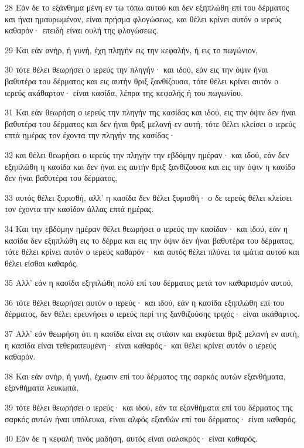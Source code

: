 \par 28 Εάν δε το εξάνθημα μένη εν τω τόπω αυτού και δεν εξηπλώθη επί του δέρματος και ήναι ημαυρωμένον, είναι πρήσμα φλογώσεως, και θέλει κρίνει αυτόν ο ιερεύς καθαρόν· επειδή είναι ουλή της φλογώσεως.
\par 29 Και εάν ανήρ, ή γυνή, έχη πληγήν εις την κεφαλήν, ή εις το πωγώνιον,
\par 30 τότε θέλει θεωρήσει ο ιερεύς την πληγήν· και ιδού, εάν εις την όψιν ήναι βαθυτέρα του δέρματος και εις αυτήν θριξ ξανθίζουσα, τότε θέλει κρίνει αυτόν ο ιερεύς ακάθαρτον· είναι κασίδα, λέπρα της κεφαλής ή του πωγωνίου.
\par 31 Και εάν θεωρήση ο ιερεύς την πληγήν της κασίδας και ιδού, εις την όψιν δεν ήναι βαθυτέρα του δέρματος και δεν ήναι θριξ μελανή εν αυτή, τότε θέλει κλείσει ο ιερεύς επτά ημέρας τον έχοντα την πληγήν της κασίδας·
\par 32 και θέλει θεωρήσει ο ιερεύς την πληγήν την εβδόμην ημέραν· και ιδού, εάν δεν εξηπλώθη η κασίδα και δεν ήναι εις αυτήν θριξ ξανθίζουσα και εις την όψιν η κασίδα δεν ήναι βαθυτέρα του δέρματος,
\par 33 αυτός θέλει ξυρισθή, αλλ' η κασίδα δεν θέλει ξυρισθή· ο δε ιερεύς θέλει κλείσει τον έχοντα την κασίδαν άλλας επτά ημέρας.
\par 34 Και την εβδόμην ημέραν θέλει θεωρήσει ο ιερεύς την κασίδαν· και ιδού, εάν η κασίδα δεν εξηπλώθη εις το δέρμα και εις την όψιν δεν ήναι βαθυτέρα του δέρματος, τότε θέλει κρίνει αυτόν ο ιερεύς καθαρόν· και αυτός θέλει πλύνει τα ιμάτια αυτού και θέλει είσθαι καθαρός.
\par 35 Αλλ' εάν η κασίδα εξηπλώθη πολύ επί του δέρματος μετά τον καθαρισμόν αυτού,
\par 36 τότε θέλει θεωρήσει αυτόν ο ιερεύς· και ιδού, εάν η κασίδα εξηπλώθη επί του δέρματος, δεν θέλει ερευνήσει ο ιερεύς περί της ξανθιζούσης τριχός· είναι ακάθαρτος.
\par 37 Αλλ' εάν θεωρήση ότι η κασίδα είναι εις στάσιν και εκφύεται θριξ μελανή εν αυτή, η κασίδα είναι τεθεραπευμένη· είναι καθαρός· και θέλει κρίνει αυτόν ο ιερεύς καθαρόν.
\par 38 Και εάν ανήρ, ή γυνή, έχωσιν επί του δέρματος της σαρκός αυτών εξανθήματα, εξανθήματα λευκωπά,
\par 39 τότε θέλει θεωρήσει ο ιερεύς· και ιδού, εάν τα εξανθήματα επί του δέρματος της σαρκός αυτών ήναι υπόλευκα, είναι αλφός εξανθών επί του δέρματος· είναι καθαρός.
\par 40 Εάν δε η κεφαλή τινός μαδήση, αυτός είναι φαλακρός· είναι καθαρός.
